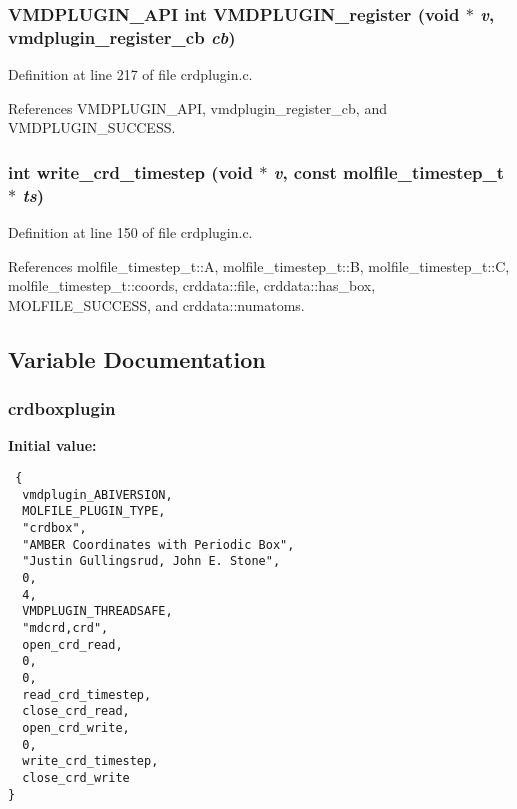 \subsubsection{\setlength{\rightskip}{0pt plus 5cm}VMDPLUGIN\_\-API int VMDPLUGIN\_\-register (void $\ast$ {\em v}, {\bf vmdplugin\_\-register\_\-cb} {\em cb})}\label{crdplugin_8c_a10}




Definition at line 217 of file crdplugin.c.

References VMDPLUGIN\_\-API, vmdplugin\_\-register\_\-cb, and VMDPLUGIN\_\-SUCCESS.
\subsubsection{\setlength{\rightskip}{0pt plus 5cm}int write\_\-crd\_\-timestep (void $\ast$ {\em v}, const {\bf molfile\_\-timestep\_\-t} $\ast$ {\em ts})\hspace{0.3cm}{\tt  [static]}}\label{crdplugin_8c_a6}




Definition at line 150 of file crdplugin.c.

References molfile\_\-timestep\_\-t::A, molfile\_\-timestep\_\-t::B, molfile\_\-timestep\_\-t::C, molfile\_\-timestep\_\-t::coords, crddata::file, crddata::has\_\-box, MOLFILE\_\-SUCCESS, and crddata::numatoms.

\subsection{Variable Documentation}
\subsubsection{ crdboxplugin\hspace{0.3cm}{\tt  [static]}}\label{crdplugin_8c_a1}


{\bf Initial value:}

\footnotesize\begin{verbatim} {
  vmdplugin_ABIVERSION,                         
  MOLFILE_PLUGIN_TYPE,                          
  "crdbox",                                     
  "AMBER Coordinates with Periodic Box",        
  "Justin Gullingsrud, John E. Stone",          
  0,                                            
  4,                                            
  VMDPLUGIN_THREADSAFE,                         
  "mdcrd,crd",                                  
  open_crd_read,
  0,
  0,
  read_crd_timestep,
  close_crd_read,
  open_crd_write,
  0,
  write_crd_timestep,
  close_crd_write
}\end{verbatim}\normalsize 



